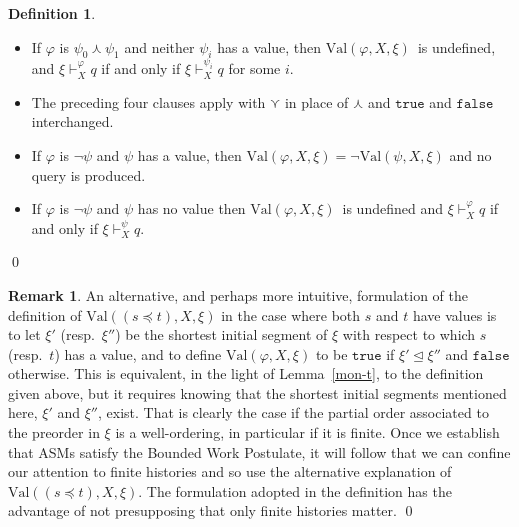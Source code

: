 \documentclass{LMCS}
\theoremstyle{definition}
\newtheorem{df}[thm]{Definition}
\newtheorem{rmk}[thm]{Remark}
\newenvironment{ls}{\begin{itemize}}{\end{itemize}}
\newcommand{\initeq}{\unlhd}
\newcommand{\kand}{\curlywedge}
\newcommand{\kor}{\curlyvee}
\newcommand{\ttt}[1]{\ensuremath{\mathtt {#1}}}
\newcommand{\val}[3]{\ensuremath{\text{Val}(#1,#2,#3)}}
\renewcommand{\phi}{\varphi}
\begin{document}
\begin{df}
\begin{ls}
  $\val\phi X\xi$ is undefined, and $\xi\vdash^\phi_Xq$ if and only if
  $\xi\vdash^{\psi_{1-i}}_Xq$.
  \item If $\phi$ is $\psi_0\kand\psi_1$ and neither $\psi_i$ has a
  value, then \val\phi X\xi\ is undefined, and $\xi\vdash^\phi_Xq$
  if and only if $\xi\vdash^{\psi_i}_Xq$ for some $i$.
  \item The preceding four clauses apply with $\kor$ in place of
  $\kand$ and \ttt{true} and \ttt{false} interchanged.
  \item If $\phi$ is $\neg\psi$ and $\psi$ has a value, then
  $\val\phi X\xi=\neg\val\psi X\xi$ and no query is produced.
  \item If $\phi$ is $\neg\psi$ and $\psi$ has no value then
  \val\phi X\xi\ is undefined and $\xi\vdash^\phi_Xq$ if and only
  if $\xi\vdash^{\psi}_Xq$.
\end{ls}
\qed\end{df}

\begin{rmk}
An alternative, and perhaps more intuitive, formulation of the
definition of $\val{(s\preceq t)}X\xi$ in the case where both $s$ and
$t$ have values is to let $\xi'$ (resp.\ $\xi''$) be the shortest
initial segment of $\xi$ with respect to which $s$ (resp.\ $t$) has a
value, and to define $\val\phi X\xi$ to be \ttt{true} if
$\xi'\initeq\xi''$ and \ttt{false} otherwise.  This is equivalent, in
the light of Lemma~\ref{mon-t}, to the definition given above, but it
requires knowing that the shortest initial segments mentioned here,
$\xi'$ and $\xi''$, exist.  That is clearly the case if the partial
order associated to the preorder in $\xi$ is a well-ordering, in
particular if it is finite.  Once we establish that ASMs satisfy the
Bounded Work Postulate, it will follow that we can confine our
attention to finite histories and so use the alternative explanation
of \val{(s\preceq t)}X\xi.  The formulation adopted in the definition
has the advantage of not presupposing that only finite histories
matter.
\qed\end{rmk}
\end{document}

